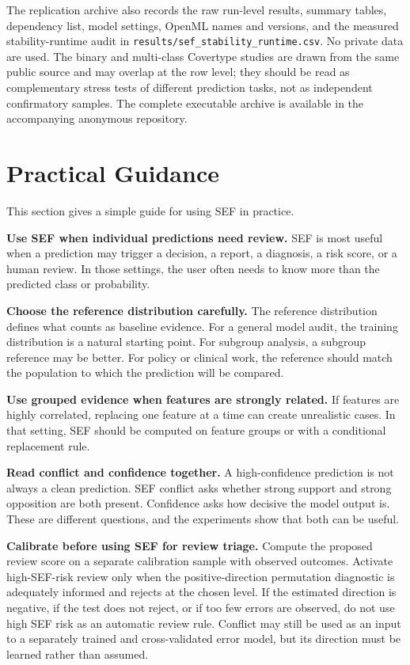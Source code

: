 \documentclass[11pt]{article}
\begin{document}
The replication archive also records the raw run-level results, summary tables, dependency list, model settings, OpenML names and versions, and the measured stability-runtime audit in \texttt{results/sef\_stability\_runtime.csv}. No private data are used. The binary and multi-class Covertype studies are drawn from the same public source and may overlap at the row level; they should be read as complementary stress tests of different prediction tasks, not as independent confirmatory samples. The complete executable archive is available in the accompanying anonymous repository.

\FloatBarrier

\section{Practical Guidance}

This section gives a simple guide for using SEF in practice.

\textbf{Use SEF when individual predictions need review.} SEF is most useful when a prediction may trigger a decision, a report, a diagnosis, a risk score, or a human review. In those settings, the user often needs to know more than the predicted class or probability.

\textbf{Choose the reference distribution carefully.} The reference distribution defines what counts as baseline evidence. For a general model audit, the training distribution is a natural starting point. For subgroup analysis, a subgroup reference may be better. For policy or clinical work, the reference should match the population to which the prediction will be compared.

\textbf{Use grouped evidence when features are strongly related.} If features are highly correlated, replacing one feature at a time can create unrealistic cases. In that setting, SEF should be computed on feature groups or with a conditional replacement rule.

\textbf{Read conflict and confidence together.} A high-confidence prediction is not always a clean prediction. SEF conflict asks whether strong support and strong opposition are both present. Confidence asks how decisive the model output is. These are different questions, and the experiments show that both can be useful.

\textbf{Calibrate before using SEF for review triage.} Compute the proposed review score on a separate calibration sample with observed outcomes. Activate high-SEF-risk review only when the positive-direction permutation diagnostic is adequately informed and rejects at the chosen level. If the estimated direction is negative, if the test does not reject, or if too few errors are observed, do not use high SEF risk as an automatic review rule. Conflict may still be used as an input to a separately trained and cross-validated error model, but its direction must be learned rather than assumed.
\end{document}
